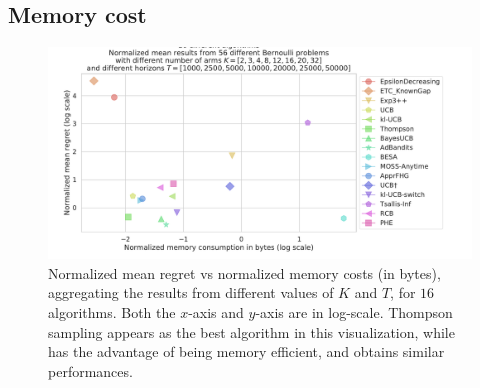 

\subsection{Memory cost}


\begin{figure}[h!]  %
	\includegraphics[width=1.10\linewidth]{16_different_algorithms__lognormregret_vs_lognormmemory__56pb__7Ks_7Ts.pdf}
	\caption[Normalized mean regret vs normalized memory costs (in bytes).]{
        Normalized mean regret vs normalized memory costs (in bytes),
        aggregating the results from different values of $K$ and $T$, for $16$ algorithms.
        Both the $x$-axis and $y$-axis are in log-scale.
        Thompson sampling appears as the best algorithm in this visualization, while \UCB{} has the advantage of being memory efficient, and \klUCB{} obtains similar performances.
	}
	\label{fig:3:16_different_algorithms__lognormregret_vs_lognormmemory__56pb__7Ks_7Ts}
\end{figure}


